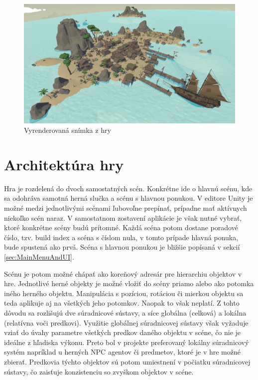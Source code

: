 \documentclass[slovak, master]{diploma}
\begin{document}
\begin{figure}[!htbp]
	\centering
	\includegraphics[width=.9\textwidth]{Figures/game_compressed.png}
	\caption{Vyrenderovaná snímka z hry}
	\label{pic:GameScreenshot}
\end{figure}

\section{Architektúra hry}
\label{sec:GameStructure}
Hra je rozdelená do dvoch samostatných scén. Konkrétne ide o hlavnú scénu, kde sa odohráva samotná herná slučka a scénu s hlavnou ponukou. V editore Unity je možné medzi jednotlivými scénami ľubovoľne prepínať, prípadne mať aktívnych niekoľko scén naraz. V samostatnom zostavení aplikácie je však nutné vybrať, ktoré konkrétne scény budú prítomné. Každá scéna potom dostane poradové číslo, tzv. build index a scéna s číslom nula, v tomto prípade hlavná ponuka, bude spustená ako prvá. Scéna s hlavnou ponukou je bližšie popísaná v sekcií \ref{sec:MainMenuAndUI}.

Scénu je potom možné chápať ako koreňový adresár pre hierarchiu objektov v hre. Jednotlivé herné objekty je možné vložiť do scény priamo alebo ako potomka iného herného objektu. Manipulácia s pozíciou, rotáciou či mierkou objektu sa teda aplikuje aj na všetkých jeho potomkov. Naopak to však neplatí. Z tohto dôvodu sa rozlišujú dve súradnicové sústavy, a síce globálna (celková) a lokálna (relatívna voči predkovi). Využitie globálnej súradnicovej sústavy však vyžaduje vziať do úvahy parametre všetkých predkov daného objektu v scéne, čo nie je ideálne z hľadiska výkonu. Preto bol v projekte preferovaný lokálny súradnicový systém napríklad u herných NPC agentov či predmetov, ktoré je v hre možné zbierať. Predkovia týchto objektov sú potom umiestnení v počiatku súradnicovej sústavy, čo zaisťuje konzistenciu so zvyškom objektov v scéne.
\end{document}
